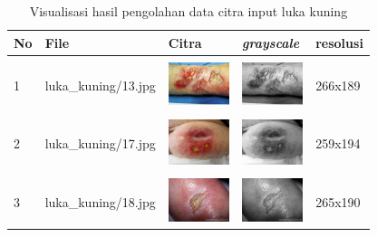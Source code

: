 \begin{table}[H]
	\centering
	\caption{Visualisasi hasil pengolahan data citra input luka kuning}
	\label{tabel_input_5}
	\begin{tabular}{|m{0.2in}|m{1.2in}|m{0.7in}|m{0.7in}|m{0.7in}|}
		\hline
		\textbf{No} & \textbf{File} & \textbf{Citra} & \textbf{\emph{grayscale}} & \textbf{resolusi} \\
		\hline
		
		& &  &  &\\
		1 & 
		luka\_kuning/13.jpg &
		\includegraphics[width=0.7in]{dataset/dataset_3/luka_kuning/ready/13.jpg}&
		\includegraphics[width=0.7in]{dataset/dataset_3/luka_kuning/ready/13_gray.jpg}&
		266x189\\
		\hline
		
		& &  &  &\\
		2& 
		luka\_kuning/17.jpg &
		\includegraphics[width=0.7in]{dataset/dataset_3/luka_kuning/ready/17.jpg}&
		\includegraphics[width=0.7in]{dataset/dataset_3/luka_kuning/ready/17_gray.jpg}&
		259x194\\
		\hline
		
		& &  &  &\\
		3& 
		luka\_kuning/18.jpg &
		\includegraphics[width=0.7in]{dataset/dataset_3/luka_kuning/ready/18.jpg}&
		\includegraphics[width=0.7in]{dataset/dataset_3/luka_kuning/ready/18_gray.jpg}&
		265x190\\
		\hline
		

\end{tabular}
\end{table}
